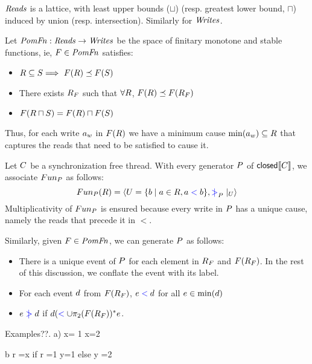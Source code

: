 $\mathit{Reads}$ is a lattice, with least upper bounds ($\sqcup$) (resp. greatest lower bound, $\sqcap$)  induced by union (resp. intersection).  Similarly for $\mathit{Writes}$. 

\begin{definition}
Let $\mathit{PomFn}: \mathit{Reads} \rightarrow \mathit{Writes}$ be the space of finitary monotone and stable functions, ie, $F \in \mathit{PomFn}$ satisfies:
\begin{itemize}
\item $R \subseteq S \Longrightarrow\ F(R) \preceq F(S)$
\item There exists $R_{F}$ such that $\forall R$, $F(R) \preceq F(R_{F})$
\item $F(R \sqcap S) =  F(R) \sqcap F(S)$
\end{itemize}
\end{definition}
Thus, for each write  $a_w$ in $F(R)$ we have a minimum cause $\min(a_w) \subseteq R$ that captures the reads that need to be satisfied to cause it.   

Let $C$ be a synchronization free thread.   With every generator $P$ of  $\textsf{closed}\llbracket C\rrbracket$, we associate $Fun_{P}$ as follows:
\[ Fun_{P}(R) = \langle U = \{ b \mid a \in R, a \mathrel{{\color{blue}<}} b \}, \mathrel{{\color{blue}\mkern4mu\mid\!\!\!>}}_{P} \mathbin{|}_{U} \rangle \]
Multiplicativity  of $Fun_{P}$ is ensured because every write in $P$ has a unique cause, namely the reads that precede it in $\lt$.

Similarly, given $F \in \mathit{PomFn}$, we can generate $P$ as follows:
\begin{itemize}
\item There is a unique event of $P$ for each element in $R_{F}$ and $F(R_{F})$.  In the rest of this discussion, we conflate the event with its label.
\item For each event $d$ from $F(R_{F})$, $e \mathrel{{\color{blue}<}} d$ for all $e \in \min(d)$
\item $e \mathrel{{\color{blue}\mkern4mu\mid\!\!\!>}} d$ if $ d (\mathrel{{\color{blue}<}} \cup \pi_2(F(R_{F}))^* e$.
\end{itemize}

Examples??.  
a) x= 1
x=2

b  r =x
   if r =1  {y=1}
   else      {y =2}

